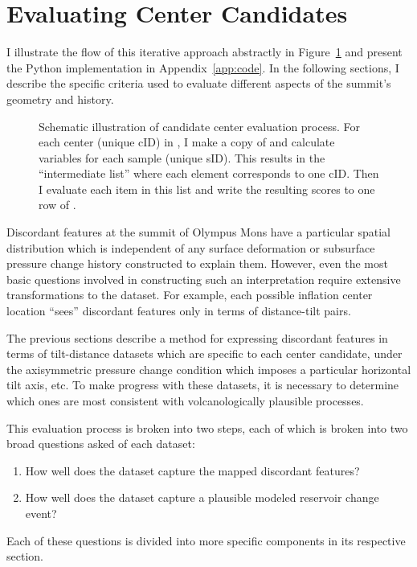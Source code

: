 \section{Evaluating Center Candidates}\label{sec:evaluation}

I illustrate the flow of this iterative approach abstractly in Figure~\ref{fig:eval-model} and present the Python implementation in Appendix~\ref{app:code}. In the following sections, I describe the specific criteria used to evaluate different aspects of the summit's geometry and history.

\begin{figure}
    \caption[Center evaluation workflow]{Schematic illustration of candidate center evaluation process. For each center (unique cID) in , I make a copy of  and calculate variables for each sample (unique sID). This results in the ``intermediate list'' where each element corresponds to one cID. Then I evaluate each item in this list and write the resulting scores to one row of .}%
    \label{fig:eval-model}
\end{figure}

Discordant features at the summit of Olympus Mons have a particular spatial distribution which is independent of any surface deformation or subsurface pressure change history constructed to explain them. However, even the most basic questions involved in constructing such an interpretation require extensive transformations to the dataset. For example, each possible inflation center location ``sees'' discordant features only in terms of distance-tilt pairs.

The previous sections describe a method for expressing discordant features in terms of tilt-distance datasets which are specific to each center candidate, under the axisymmetric pressure change condition which imposes a particular horizontal tilt axis, etc. To make progress with these datasets, it is necessary to determine which ones are most consistent with volcanologically plausible processes.

This evaluation process is broken into two steps, each of which is broken into two broad questions asked of each dataset:
\begin{enumerate}
    \item How well does the dataset capture the mapped discordant features?
    \item How well does the dataset capture a plausible modeled reservoir change event?
\end{enumerate}
Each of these questions is divided into more specific components in its respective section.

